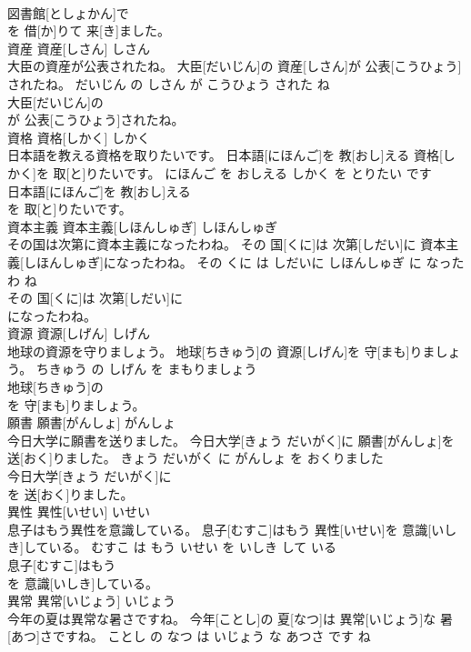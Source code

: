 \documentclass[8pt]{extreport}
\begin{document}
\begin{CJK}{UTF8}{min}
\\	図書館[としょかん]で
\\	を 借[か]りて 来[き]ました。			
\\	資産	資産[しさん]	しさん	
\\	大臣の資産が公表されたね。	大臣[だいじん]の 資産[しさん]が 公表[こうひょう]されたね。	だいじん の しさん が こうひょう された ね	
\\	大臣[だいじん]の
\\	が 公表[こうひょう]されたね。			
\\	資格	資格[しかく]	しかく	
\\	日本語を教える資格を取りたいです。	日本語[にほんご]を 教[おし]える 資格[しかく]を 取[と]りたいです。	にほんご を おしえる しかく を とりたい です	
\\	日本語[にほんご]を 教[おし]える
\\	を 取[と]りたいです。			
\\	資本主義	資本主義[しほんしゅぎ]	しほんしゅぎ	
\\	その国は次第に資本主義になったわね。	その 国[くに]は 次第[しだい]に 資本主義[しほんしゅぎ]になったわね。	その くに は しだいに しほんしゅぎ に なった わ ね	
\\	その 国[くに]は 次第[しだい]に
\\	になったわね。			
\\	資源	資源[しげん]	しげん	
\\	地球の資源を守りましょう。	地球[ちきゅう]の 資源[しげん]を 守[まも]りましょう。	ちきゅう の しげん を まもりましょう	
\\	地球[ちきゅう]の
\\	を 守[まも]りましょう。			
\\	願書	願書[がんしょ]	がんしょ	
\\	今日大学に願書を送りました。	今日大学[きょう だいがく]に 願書[がんしょ]を 送[おく]りました。	きょう だいがく に がんしょ を おくりました	
\\	今日大学[きょう だいがく]に
\\	を 送[おく]りました。			
\\	異性	異性[いせい]	いせい	
\\	息子はもう異性を意識している。	息子[むすこ]はもう 異性[いせい]を 意識[いしき]している。	むすこ は もう いせい を いしき して いる	
\\	息子[むすこ]はもう
\\	を 意識[いしき]している。			
\\	異常	異常[いじょう]	いじょう	
\\	今年の夏は異常な暑さですね。	今年[ことし]の 夏[なつ]は 異常[いじょう]な 暑[あつ]さですね。	ことし の なつ は いじょう な あつさ です ね	

\end{CJK}
\end{document}
